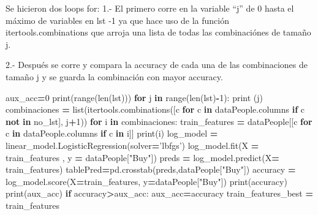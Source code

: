 \documentclass[]{article}
\newenvironment{Shaded}{\begin{snugshade}}{\end{snugshade}}
\newcommand{\KeywordTok}[1]{\textcolor[rgb]{0.13,0.29,0.53}{\textbf{#1}}}
\newcommand{\DecValTok}[1]{\textcolor[rgb]{0.00,0.00,0.81}{#1}}
\newcommand{\StringTok}[1]{\textcolor[rgb]{0.31,0.60,0.02}{#1}}
\newcommand{\ControlFlowTok}[1]{\textcolor[rgb]{0.13,0.29,0.53}{\textbf{#1}}}
\newcommand{\OperatorTok}[1]{\textcolor[rgb]{0.81,0.36,0.00}{\textbf{#1}}}
\newcommand{\BuiltInTok}[1]{#1}
\newcommand{\NormalTok}[1]{#1}
\begin{document}
Se hicieron dos loops for: 1.- El primero corre en la variable ``j'' de
0 hasta el máximo de variables en lst -1 ya que hace uso de la función
itertools.combinations que arroja una lista de todas las combinaciónes
de tamaño j.

2.- Después se corre y compara la accuracy de cada una de las
combinaciones de tamaño j y se guarda la combinación con mayor accuracy.

\begin{Shaded}
\begin{Highlighting}[]
\NormalTok{aux_acc}\OperatorTok{=}\DecValTok{0}
\BuiltInTok{print}\NormalTok{(}\BuiltInTok{range}\NormalTok{(}\BuiltInTok{len}\NormalTok{(lst)))}
\ControlFlowTok{for}\NormalTok{ j }\KeywordTok{in} \BuiltInTok{range}\NormalTok{(}\BuiltInTok{len}\NormalTok{(lst)}\OperatorTok{-}\DecValTok{1}\NormalTok{):}
    \BuiltInTok{print}\NormalTok{ (j)}
\NormalTok{    combinaciones }\OperatorTok{=} \BuiltInTok{list}\NormalTok{(itertools.combinations([c }\ControlFlowTok{for}\NormalTok{ c }\KeywordTok{in}\NormalTok{ dataPeople.columns }\ControlFlowTok{if}\NormalTok{ c }\KeywordTok{not} \KeywordTok{in}\NormalTok{ no_lst], j}\OperatorTok{+}\DecValTok{1}\NormalTok{))}
    \ControlFlowTok{for}\NormalTok{ i }\KeywordTok{in}\NormalTok{ combinaciones:}
\NormalTok{        train_features }\OperatorTok{=}\NormalTok{ dataPeople[[c }\ControlFlowTok{for}\NormalTok{ c }\KeywordTok{in}\NormalTok{ dataPeople.columns }\ControlFlowTok{if}\NormalTok{ c }\KeywordTok{in}\NormalTok{ i]]}
        \BuiltInTok{print}\NormalTok{(i)}
\NormalTok{        log_model }\OperatorTok{=}\NormalTok{ linear_model.LogisticRegression(solver}\OperatorTok{=}\StringTok{'lbfgs'}\NormalTok{)}
\NormalTok{        log_model.fit(X }\OperatorTok{=}\NormalTok{ train_features ,}
\NormalTok{                 y }\OperatorTok{=}\NormalTok{ dataPeople[}\StringTok{"Buy"}\NormalTok{])}
\NormalTok{        preds }\OperatorTok{=}\NormalTok{ log_model.predict(X}\OperatorTok{=}\NormalTok{ train_features)}
\NormalTok{        tablePred}\OperatorTok{=}\NormalTok{pd.crosstab(preds,dataPeople[}\StringTok{"Buy"}\NormalTok{])}
\NormalTok{        accuracy  }\OperatorTok{=}\NormalTok{ log_model.score(X}\OperatorTok{=}\NormalTok{train_features,}
\NormalTok{                               y}\OperatorTok{=}\NormalTok{dataPeople[}\StringTok{"Buy"}\NormalTok{])}
        \BuiltInTok{print}\NormalTok{(accuracy)}
        \BuiltInTok{print}\NormalTok{(aux_acc)}
        \ControlFlowTok{if}\NormalTok{ accuracy}\OperatorTok{>}\NormalTok{aux_acc:}
\NormalTok{            aux_acc}\OperatorTok{=}\NormalTok{accuracy}
\NormalTok{            train_features_best }\OperatorTok{=}\NormalTok{ train_features}
            
\end{Highlighting}
\end{Shaded}
\end{document}
